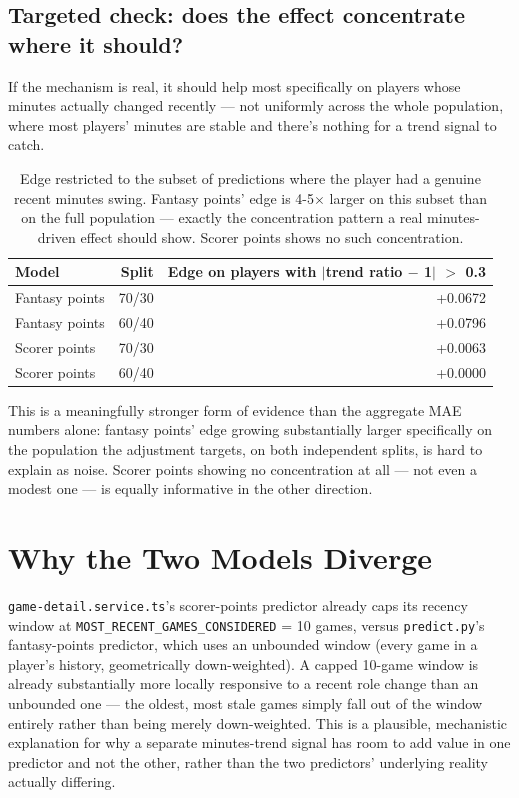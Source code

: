 \documentclass[11pt]{article}
\newcommand{\code}[1]{\allowbreak\texttt{\small #1}\allowbreak}
\begin{document}
\subsection{Targeted check: does the effect concentrate where it should?}

If the mechanism is real, it should help most specifically on players whose minutes actually changed
recently — not uniformly across the whole population, where most players' minutes are stable and there's
nothing for a trend signal to catch.

\begin{table}[h]
\centering
\small
\begin{tabular}{lrr}
\toprule
Model & Split & Edge on players with $|$trend ratio $-$ 1$|$ $>$ 0.3 \\
\midrule
Fantasy points & 70/30 & +0.0672 \\
Fantasy points & 60/40 & +0.0796 \\
Scorer points & 70/30 & +0.0063 \\
Scorer points & 60/40 & +0.0000 \\
\bottomrule
\end{tabular}
\caption{Edge restricted to the subset of predictions where the player had a genuine recent minutes swing.
Fantasy points' edge is 4-5$\times$ larger on this subset than on the full population — exactly the
concentration pattern a real minutes-driven effect should show. Scorer points shows no such concentration.}
\end{table}

This is a meaningfully stronger form of evidence than the aggregate MAE numbers alone: fantasy points'
edge growing substantially larger specifically on the population the adjustment targets, on both independent
splits, is hard to explain as noise. Scorer points showing no concentration at all — not even a modest one —
is equally informative in the other direction.

\section{Why the Two Models Diverge}

\code{game-detail.service.ts}'s scorer-points predictor already caps its recency window at
\code{MOST\_RECENT\_GAMES\_CONSIDERED} = 10 games, versus \code{predict.py}'s fantasy-points predictor, which
uses an unbounded window (every game in a player's history, geometrically down-weighted). A capped 10-game
window is already substantially more locally responsive to a recent role change than an unbounded one — the
oldest, most stale games simply fall out of the window entirely rather than being merely down-weighted. This
is a plausible, mechanistic explanation for why a separate minutes-trend signal has room to add value in one
predictor and not the other, rather than the two predictors' underlying reality actually differing.
\end{document}
